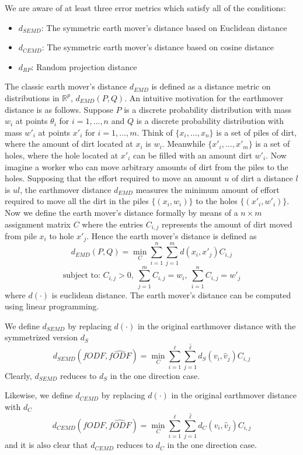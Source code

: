 \documentclass[11pt]{article}
\begin{document}
We are aware of at least three error metrics which satisfy all of the conditions:
\begin{itemize}
\item $d_{SEMD}$: The symmetric earth mover's distance based on Euclidean distance
\item $d_{CEMD}$: The symmetric earth mover's distance based on cosine distance
\item $d_{RP}$: Random projection distance
\end{itemize}

The classic earth mover's distance $d_{EMD}$ is defined as a
distance metric on distributions in $\mathbb{R}^p$,
$d_{EMD}(P,Q)$.
An intuitive motivation for the earthmover distance is as follows.
Suppose $P$ is a discrete probability distribution with mass $w_i$ at points
$\theta_i$ for $i=1,\hdots,n$ and $Q$ is a discrete probability
distribution with mass $w'_i$ at points $x'_i$ for $i = 1,\hdots,m$.
Think of
$\{x_i,\hdots,x_n\}$ is a set of piles of dirt,
where the amount of dirt located at $x_i$ is $w_i$.
Meanwhile $\{x'_i,\hdots,x'_m\}$ is a set of holes, where the hole
located at $x'_i$ can be filled with an amount dirt $w'_i$.
Now imagine a worker who can move arbitrary amounts of dirt from
the piles to the holes.
Supposing that the effort required to move an amount $u$ of dirt a
distance $l$ is $ul$, the earthmover distance $d_{EMD}$
measures the minimum amount of effort required to move all the dirt in
the piles $\{(x_i,w_i)\}$ to the holes $\{(x'_i,w'_i)\}$.
Now we define the earth mover's distance formally by means of a $n\times m$
assignment matrix $C$ where the entries $C_{i,j}$ represents the
amount of dirt moved from pile $x_i$ to hole $x'_j$.
Hence the earth mover's distance is defined as
\[
d_{EMD}(P,Q) = \min_C \sum_{i=1}^n \sum_{j=1}^m d(x_i,x'_j)C_{i,j}
\]
\[
\text{subject to: } C_{i,j} > 0,\ \sum_{j=1}^m C_{i,j} = w_i,\
\sum_{i=1}^n C_{i,j} = w'_j
\]
where $d(\cdot)$ is euclidean distance. 
The earth mover's distance can be computed using linear programming.

We define $d_{SEMD}$ by replacing $d(\cdot)$ in the original earthmover
distance with the symmetrized version $d_S$
\[
d_{SEMD}(fODF,\hat{fODF})=\min_C \sum_{i=1}^\ell \sum_{j=1}^{\hat{\ell}} d_S(v_i,\hat{v}_j)C_{i,j}
\]
Clearly, $d_{SEMD}$ reduces to $d_S$ in the one direction case.

Likewise, we define $d_{CEMD}$ by replacing $d(\cdot)$ in the original earthmover
distance with $d_C$
\[
d_{CEMD}(fODF,\hat{fODF})=\min_C \sum_{i=1}^\ell \sum_{j=1}^{\hat{\ell}} d_C(v_i,\hat{v}_j)C_{i,j}
\]
and it is also clear that $d_{CEMD}$ reduces to $d_{C}$ in the
one direction case.
\end{document}
